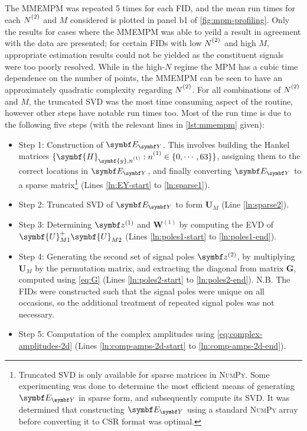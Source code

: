 The \ac{MMEMPM} was repeated 5 times for each \ac{FID}, and the mean run
times for each $\Ntwo$ and $M$ considered is plotted in panel b1 of
\cref{fig:mpm-profiling}.
Only the results for cases where the \ac{MMEMPM} was able to yeild a result in
agreement with the data are presented; for certain \acp{FID} with low
$\Ntwo$ and high $M$, appropriate estimation results could not be yielded as
the constituent signals were too poorly resolved.
While in the high-$N$ regime the \ac{MPM} has a cubic time dependence
on the number of points, the \ac{MMEMPM} can be seen to have an approximately
quadratic complexity regarding $\Ntwo$.
For all combinations of $\Ntwo$ and $M$,
the truncated \ac{SVD} was the most time consuming aspect of the routine,
however other steps have notable run times too. Most of the run time is due to
the following five steps (with the relevant lines in \cref{lst:mmempm} given):
\begin{itemize}
    \item Step 1: Construction of $\EY$. This involves building the Hankel matrices
        $\lbrace \symbf{H}_{\symbf{y},\none} : \none \in \lbrace 0, \cdots, 63
        \rbrace \rbrace$, assigning them to the
        correct locations in $\EY$, and finally converting  $\EY$ to a sparse
        matrix\footnote{
            Truncated \ac{SVD} is only available for sparse matrices in
            \textsc{NumPy}\cite{svds}. Some experimenting was done to determine
            the most efficient means of generating $\EY$ in sparse form, and
            subsequently compute its \ac{SVD}.
            It was determined that constructing $\EY$ using a
            standard \textsc{NumPy} array before converting it to
            \ac{CSR} format\cite{csr} was optimal.
        } (Lines \ref{ln:EY-start} to \ref{ln:sparse1}).
    \item Step 2: Truncated \ac{SVD} of $\EY$ to form $\symbf{U}_M$ (Line \ref{ln:sparse2}).
    \item Step 3: Determining $\bdzone$ and  $\symbf{W}^{(1)}$ by computing the
        \ac{EVD} of $\symbf{U}_{M1}^+ \symbf{U}_{M2}^{\vphantom{+}}$ (Lines
        \ref{ln:poles1-start} to \ref{ln:poles1-end}).
    \item Step 4: Generating the second set of signal poles $\bdztwo$, by
        multiplying $\symbf{U}_M$ by the permutation matrix, and extracting
        the diagonal from matrix $\symbf{G}$, computed using \cref{eq:G} (Lines
        \ref{ln:poles2-start} to \ref{ln:poles2-end}). N.B. The \acp{FID} were
        constructed such that the signal poles were unique on all occasions, so
        the additional treatment of repeated signal poles was not necessary.
    \item Step 5: Computation of the complex amplitudes using
        \cref{eq:complex-amplitudes-2d} (Lines \ref{ln:comp-amps-2d-start} to
        \ref{ln:comp-amps-2d-end}).
\end{itemize}

